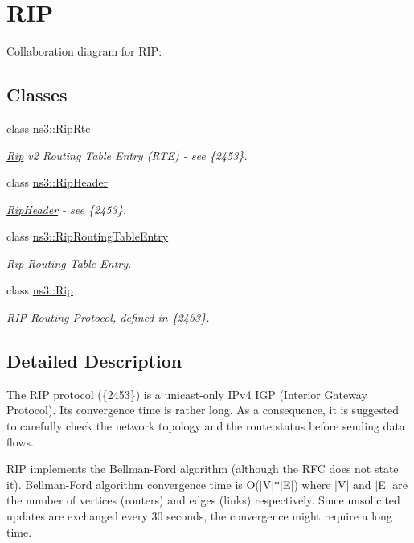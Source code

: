\hypertarget{group__rip}{}\section{R\+IP}
\label{group__rip}
Collaboration diagram for R\+IP\+:
\subsection*{Classes}
\begin{DoxyCompactItemize}
\item 
class \hyperlink{classns3_1_1RipRte}{ns3\+::\+Rip\+Rte}
\begin{DoxyCompactList}\small\item\em \hyperlink{classns3_1_1Rip}{Rip} v2 Routing Table Entry (R\+TE) -\/ see \{2453\}. \end{DoxyCompactList}\item 
class \hyperlink{classns3_1_1RipHeader}{ns3\+::\+Rip\+Header}
\begin{DoxyCompactList}\small\item\em \hyperlink{classns3_1_1RipHeader}{Rip\+Header} -\/ see \{2453\}. \end{DoxyCompactList}\item 
class \hyperlink{classns3_1_1RipRoutingTableEntry}{ns3\+::\+Rip\+Routing\+Table\+Entry}
\begin{DoxyCompactList}\small\item\em \hyperlink{classns3_1_1Rip}{Rip} Routing Table Entry. \end{DoxyCompactList}\item 
class \hyperlink{classns3_1_1Rip}{ns3\+::\+Rip}
\begin{DoxyCompactList}\small\item\em R\+IP Routing Protocol, defined in \{2453\}. \end{DoxyCompactList}\end{DoxyCompactItemize}


\subsection{Detailed Description}
The R\+IP protocol (\{2453\}) is a unicast-\/only I\+Pv4 I\+GP (Interior Gateway Protocol). Its convergence time is rather long. As a consequence, it is suggested to carefully check the network topology and the route status before sending data flows.

R\+IP implements the Bellman-\/\+Ford algorithm (although the R\+FC does not state it). Bellman-\/\+Ford algorithm convergence time is O($\vert$\+V$\vert$$\ast$$\vert$\+E$\vert$) where $\vert$\+V$\vert$ and $\vert$\+E$\vert$ are the number of vertices (routers) and edges (links) respectively. Since unsolicited updates are exchanged every 30 seconds, the convergence might require a long time.

